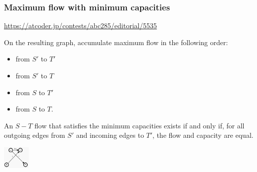 \subsubsection*{Maximum flow with minimum capacities}
\url{https://atcoder.jp/contests/abc285/editorial/5535}

On the resulting graph, 
accumulate maximum flow in the following order:
\begin{itemize}
\item from $S'$ to $T'$
\item from $S'$ to $T$
\item from $S$ to $T'$
\item from $S$ to $T$.
\end{itemize}

An $S-T$ flow that satisfies the minimum capacities 
exists if and only if, for all outgoing edges 
from $S'$ and incoming edges to $T'$, 
the flow and capacity are equal.

\begin{center}
    \includegraphics[width=0.1\textwidth]{content/graphs/max-flow-min-capacities.png}
\end{center}

